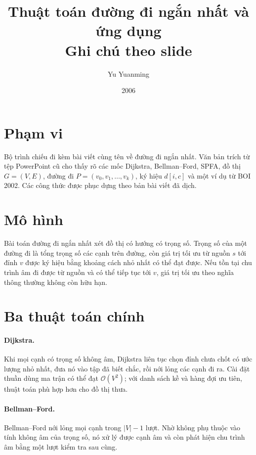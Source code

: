 \documentclass[11pt]{article}
\title{Thuật toán đường đi ngắn nhất và ứng dụng\\{\large Ghi chú theo slide}}
\author{Yu Yuanming}
\date{2006}
\newcommand{\Oh}{\mathcal{O}}
\begin{document}
\maketitle


\section{Phạm vi}

Bộ trình chiếu đi kèm bài viết cùng tên về đường đi ngắn nhất. Văn bản trích
từ tệp PowerPoint cũ cho thấy rõ các mốc Dijkstra, Bellman--Ford, SPFA, đồ
thị \(G=(V,E)\), đường đi \(P=(v_0,v_1,\ldots,v_k)\), ký hiệu \(d[i,c]\) và
một ví dụ từ BOI 2002. Các công thức được phục dựng theo bản bài viết đã dịch.

\section{Mô hình}

Bài toán đường đi ngắn nhất xét đồ thị có hướng có trọng số. Trọng số của một
đường đi là tổng trọng số các cạnh trên đường, còn giá trị tối ưu từ nguồn
\(s\) tới đỉnh \(v\) được ký hiệu bằng khoảng cách nhỏ nhất có thể đạt được.
Nếu tồn tại chu trình âm đi được từ nguồn và có thể tiếp tục tới \(v\), giá
trị tối ưu theo nghĩa thông thường không còn hữu hạn.

\section{Ba thuật toán chính}

\paragraph{Dijkstra.}
Khi mọi cạnh có trọng số không âm, Dijkstra liên tục chọn đỉnh chưa chốt có
ước lượng nhỏ nhất, đưa nó vào tập đã biết chắc, rồi nới lỏng các cạnh đi ra.
Cài đặt thuần dùng ma trận có thể đạt \(\Oh(V^2)\); với danh sách kề và hàng
đợi ưu tiên, thuật toán phù hợp hơn cho đồ thị thưa.

\paragraph{Bellman--Ford.}
Bellman--Ford nới lỏng mọi cạnh trong \(|V|-1\) lượt. Nhờ không phụ thuộc vào
tính không âm của trọng số, nó xử lý được cạnh âm và còn phát hiện chu trình
âm bằng một lượt kiểm tra sau cùng.
\end{document}
